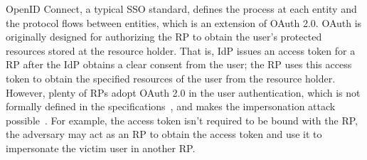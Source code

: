 OpenID Connect, a typical SSO standard,  defines the process at each entity and the protocol flows between entities,
which is  an extension of OAuth 2.0. 
OAuth is originally designed for authorizing the RP to obtain the user's protected resources stored at the resource holder. 
That is, IdP issues an access token for a RP after the IdP obtains a clear consent from the user;
 the RP uses this access token to obtain the specified resources of the user from the resource holder.
However, plenty of RPs adopt OAuth 2.0 in the user authentication, which is not formally defined in the specifications~\cite{rfc6749,rfc6750}, and makes the impersonation attack possible~\cite{ChenPCTKT14, WangZLG16}.
For example, the access token isn't required to be bound with the RP, the adversary may act as an RP to obtain the access token and use it to impersonate the victim user in another RP.



